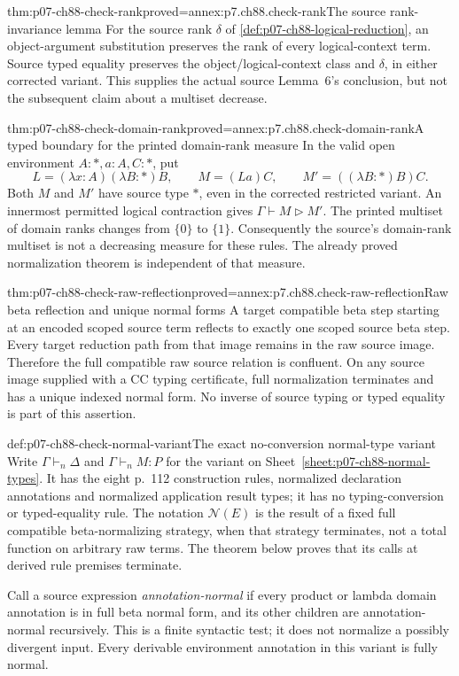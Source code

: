 \begin{hblemma}{thm:p07-ch88-check-rank}{proved=annex:p7.ch88.check-rank}{The source rank-invariance lemma}
For the source rank \(\delta\) of
\cref{def:p07-ch88-logical-reduction}, an object-argument substitution
preserves the rank of every logical-context term. Source typed equality
preserves the object/logical-context class and \(\delta\), in either
corrected variant. This supplies the actual source Lemma~6's conclusion,
but not the subsequent claim about a multiset decrease.
\end{hblemma}

\begin{hbtheorem}{thm:p07-ch88-check-domain-rank}{proved=annex:p7.ch88.check-domain-rank}{A typed boundary for the printed domain-rank measure}
In the valid open environment \(A:\ast,a:A,C:\ast\), put
\[
 L=(\lambda x:A)(\lambda B:\ast)B,\qquad
 M=(La)C,\qquad M'=((\lambda B:\ast)B)C.
\]
Both \(M\) and \(M'\) have source type \(\ast\), even in the
corrected restricted variant. An innermost permitted logical contraction
gives \(\Gamma\vdash M\triangleright M'\).
The printed multiset of domain ranks changes from \(\{0\}\) to
\(\{1\}\). Consequently the source's domain-rank multiset is not a
decreasing measure for these rules. The already proved normalization
theorem is independent of that measure.
\end{hbtheorem}

\begin{hblemma}{thm:p07-ch88-check-raw-reflection}{proved=annex:p7.ch88.check-raw-reflection}{Raw beta reflection and unique normal forms}
A target compatible beta step starting at an encoded scoped source term
reflects to exactly one scoped source beta step. Every target reduction
path from that image remains in the raw source image. Therefore the full
compatible raw source relation is confluent. On any source image supplied
with a CC typing certificate, full normalization terminates and has a
unique indexed normal form. No inverse of source typing or typed equality
is part of this assertion.
\end{hblemma}

\begin{hbdefinition}{def:p07-ch88-check-normal-variant}{The exact no-conversion normal-type variant}
Write \(\Gamma\vdash_n\Delta\) and \(\Gamma\vdash_n M:P\) for
the variant on Sheet~\ref{sheet:p07-ch88-normal-types}. It has the
eight p.~112 construction rules, normalized declaration annotations and
normalized application result types; it has no typing-conversion or
typed-equality rule. The notation \(\mathcal N(E)\) is the result of
a fixed full compatible beta-normalizing strategy, when that strategy
terminates, not a total function on arbitrary raw terms. The theorem
below proves that its calls at derived rule premises terminate.

Call a source expression \emph{annotation-normal} if every product or
lambda domain annotation is in full beta normal form, and its other
children are annotation-normal recursively. This is a finite syntactic
test; it does not normalize a possibly divergent input. Every derivable
environment annotation in this variant is fully normal.
\end{hbdefinition}

